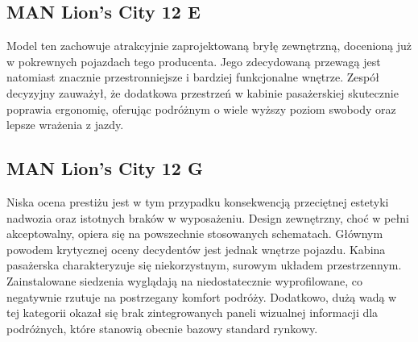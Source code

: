 \subsection{MAN Lion's City 12 E}
Model ten zachowuje atrakcyjnie zaprojektowaną bryłę zewnętrzną, docenioną już w pokrewnych pojazdach tego producenta. Jego zdecydowaną przewagą jest natomiast znacznie przestronniejsze i bardziej funkcjonalne wnętrze. Zespół decyzyjny zauważył, że dodatkowa przestrzeń w kabinie pasażerskiej skutecznie poprawia ergonomię, oferując podróżnym o wiele wyższy poziom swobody oraz lepsze wrażenia z jazdy.

\subsection{MAN Lion's City 12 G}
Niska ocena prestiżu jest w tym przypadku konsekwencją przeciętnej estetyki nadwozia oraz istotnych braków w wyposażeniu. Design zewnętrzny, choć w pełni akceptowalny, opiera się na powszechnie stosowanych schematach. Głównym powodem krytycznej oceny decydentów jest jednak wnętrze pojazdu. Kabina pasażerska charakteryzuje się niekorzystnym, surowym układem przestrzennym. Zainstalowane siedzenia wyglądają na niedostatecznie wyprofilowane, co negatywnie rzutuje na postrzegany komfort podróży. Dodatkowo, dużą wadą w tej kategorii okazał się brak zintegrowanych paneli wizualnej informacji dla podróżnych, które stanowią obecnie bazowy standard rynkowy.

